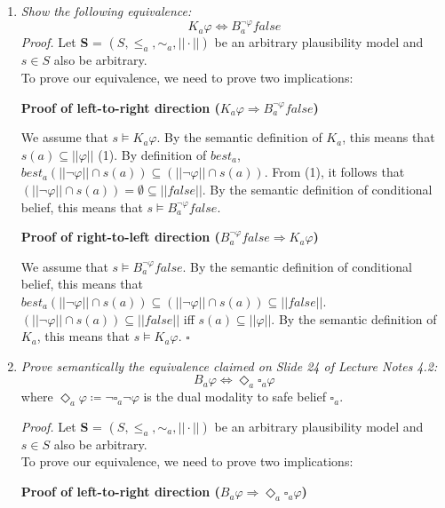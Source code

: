 \documentclass[leqno]{article}
\begin{document}
\begin{enumerate}[label=(\alph*)]
	\item \textit{Show the following equivalence:}
		$$K_a \varphi \Leftrightarrow B_a^{\neg \varphi} false$$
		\textit{Proof.} Let \textbf{S} = $(S, \le_a, \sim_a, ||\cdot||)$ be an 
		arbitrary plausibility model and $s \in S$ also be arbitrary.\\
		To prove our equivalence, we need to prove two implications:
		
		\textbf{Proof of left-to-right direction 
		($K_a \varphi \Rightarrow B_a^{\neg \varphi} false$)}
		
		We assume that $s \models K_a \varphi$. By the semantic definition of $K_a$,
		this means that $s(a) \subseteq ||\varphi||$ (1). By definition of $best_a$, 
		$best_a(||\neg \varphi|| \cap s(a)) \subseteq 
		(||\neg \varphi|| \cap s(a))$. From (1), it follows that 
		$(||\neg \varphi|| \cap s(a)) = \emptyset \subseteq ||false||$. By the 
		semantic definition of conditional belief, this means that 
		$s \models B_a^{\neg \varphi} false$.
		
		\textbf{Proof of right-to-left direction 
		($B_a^{\neg \varphi} false \Rightarrow K_a \varphi$)}
		
		We assume that $s \models B_a^{\neg \varphi} false$. By the semantic 
		definition of conditional belief, this means that 
		$best_a(||\neg \varphi|| \cap s(a)) \subseteq (||\neg \varphi|| \cap s(a)) 
		\subseteq ||false||$. $(||\neg \varphi|| \cap s(a)) \subseteq ||false||$ iff 
		$s(a) \subseteq ||\varphi||$. By the semantic definition of $K_a$, this means
		 that $s \models K_a \varphi$. 
		\hfill $\square$

	\item \textit{Prove semantically the equivalence claimed on Slide 24 of
		Lecture Notes 4.2:}
		$$B_a \varphi \Leftrightarrow \Diamond_a \square_a \varphi$$
		where $\Diamond_a \varphi \coloneqq \neg \square_a \neg \varphi$ is the dual
		modality to safe belief $\square_a$.

		\textit{Proof.} Let \textbf{S} = $(S, \le_a, \sim_a, ||\cdot||)$ be an 
		arbitrary plausibility model and $s \in S$ also be arbitrary.\\
		To prove our equivalence, we need to prove two implications:
		
		\textbf{Proof of left-to-right direction 
		($B_a \varphi \Rightarrow \Diamond_a \square_a \varphi$)}
		

\end{enumerate}
\end{document}
